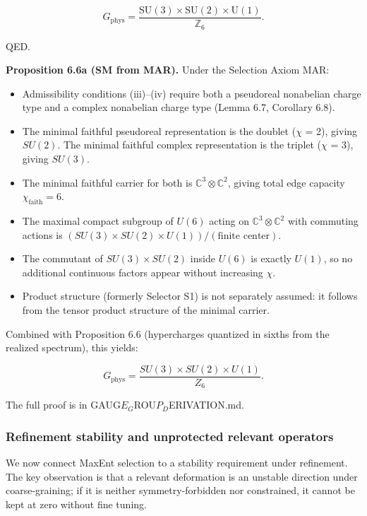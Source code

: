 \documentclass[11pt,a4paper]{article}
\theoremstyle{remark}
\providecommand{\tightlist}{%
  \setlength{\itemsep}{0pt}\setlength{\parskip}{0pt}}
\begin{document}
\[
G_{\mathrm{phys}} = \frac{\mathrm{SU}(3)\times \mathrm{SU}(2)\times \mathrm{U}(1)}{\mathbb Z_6}.
\]

QED.

\textbf{Proposition 6.6a (SM from MAR).} Under the Selection Axiom MAR:

\begin{itemize}
\tightlist
\item
  Admissibility conditions (iii)--(iv) require both a pseudoreal nonabelian
  charge type and a complex nonabelian charge type (Lemma 6.7, Corollary 6.8).
\item
  The minimal faithful pseudoreal representation is the doublet (\ensuremath{\chi} = 2),
  giving \(SU(2)\). The minimal faithful complex representation is the triplet
  (\ensuremath{\chi} = 3), giving \(SU(3)\).
\item
  The minimal faithful carrier for both is \(\mathbb{C}^3 \otimes \mathbb{C}^2\),
  giving total edge capacity \(\chi_{\mathrm{faith}} = 6\).
\item
  The maximal compact subgroup of \(U(6)\) acting on
  \(\mathbb{C}^3 \otimes \mathbb{C}^2\) with commuting actions is
  \((SU(3) \times SU(2) \times U(1))/(\text{finite center})\).
\item
  The commutant of \(SU(3) \times SU(2)\) inside \(U(6)\) is exactly \(U(1)\),
  so no additional continuous factors appear without increasing \(\chi\).
\item
  Product structure (formerly Selector S1) is not separately assumed: it
  follows from the tensor product structure of the minimal carrier.
\end{itemize}

Combined with Proposition 6.6 (hypercharges quantized in sixths from the
realized spectrum), this yields:

\[
G_{\mathrm{phys}} = \frac{SU(3) \times SU(2) \times U(1)}{Z_6}.
\]

The full proof is in GAUG$E_G$ROU$P_D$ERIVATION.md.

\subsubsection{Refinement stability and unprotected relevant operators}\label{refinement-stability-and-unprotected-relevant-operators}

We now connect MaxEnt selection to a stability requirement under refinement.
The key observation is that a relevant deformation is an unstable direction
under coarse-graining; if it is neither symmetry-forbidden nor constrained, it
cannot be kept at zero without fine tuning.
\end{document}
